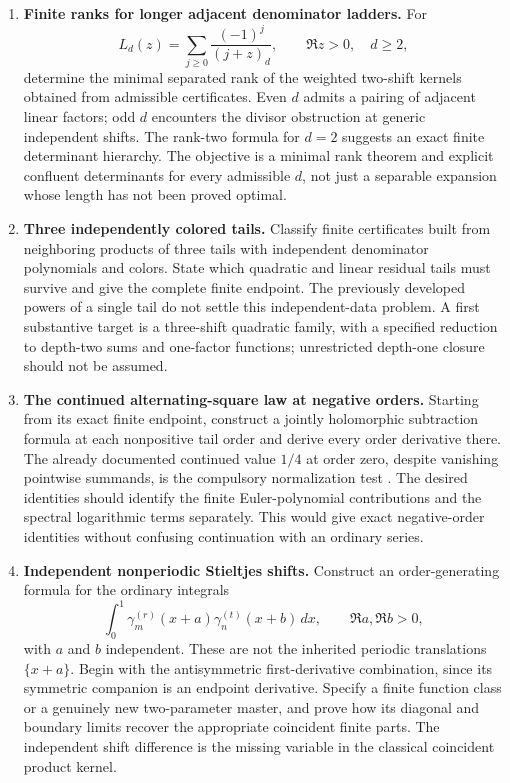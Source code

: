 \begin{enumerate}[leftmargin=*,label=\textbf{R\arabic*.}]
\item \textbf{Finite ranks for longer adjacent denominator ladders.}
For
\[
 L_d(z)=\sum_{j\ge0}\frac{(-1)^j}{(j+z)_d},\qquad
 \Re z>0,\quad d\ge2,
\]
determine the minimal separated rank of the weighted two-shift kernels
obtained from admissible certificates. Even $d$ admits a pairing of
adjacent linear factors; odd $d$ encounters the divisor obstruction
at generic independent shifts. The rank-two formula for $d=2$
suggests an exact finite determinant hierarchy. The objective is a
minimal rank theorem and explicit confluent determinants for every
admissible $d$, not just a separable expansion whose length has not
been proved optimal.

\item \textbf{Three independently colored tails.}
Classify finite certificates built from neighboring products of three
tails with independent denominator polynomials and colors. State
which quadratic and linear residual tails must survive and give the
complete finite endpoint. The previously developed powers of a single
tail do not settle this independent-data problem. A first substantive
target is a three-shift quadratic family, with a specified reduction
to depth-two sums and one-factor functions; unrestricted depth-one
closure should not be assumed.

\item \textbf{The continued alternating-square law at negative orders.}
Starting from its exact finite endpoint, construct a jointly
holomorphic subtraction formula at each nonpositive tail order and
derive every order derivative there. The already documented
continued value $1/4$ at order zero, despite vanishing pointwise
summands, is the compulsory normalization test
\cite{tail-alternating}. The desired identities should identify the
finite Euler-polynomial contributions and the spectral logarithmic
terms separately. This would give exact negative-order identities
without confusing continuation with an ordinary series.

\item \textbf{Independent nonperiodic Stieltjes shifts.}
Construct an order-generating formula for the ordinary integrals
\[
 \int_0^1\gamma_m^{(r)}(x+a)\gamma_n^{(t)}(x+b)\,dx,
 \qquad \Re a,\Re b>0,
\]
with $a$ and $b$ independent. These are not the inherited periodic
translations $\{x+a\}$. Begin with the antisymmetric first-derivative
combination, since its symmetric companion is an endpoint derivative.
Specify a finite function class or a genuinely new two-parameter
master, and prove how its diagonal and boundary limits recover the
appropriate coincident finite parts. The independent shift difference
is the missing variable in the classical coincident product kernel.


\end{enumerate}

